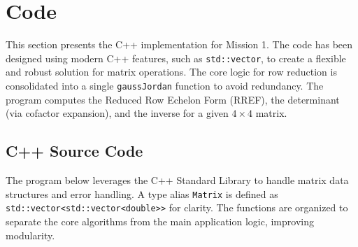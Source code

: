 \documentclass{article}
\begin{document}
\section{Code}

This section presents the C++ implementation for Mission 1. The code has been designed using modern C++ features, such as \texttt{std::vector}, to create a flexible and robust solution for matrix operations. The core logic for row reduction is consolidated into a single \texttt{gaussJordan} function to avoid redundancy. The program computes the Reduced Row Echelon Form (RREF), the determinant (via cofactor expansion), and the inverse for a given $4 \times 4$ matrix.

\subsection{C++ Source Code}

The program below leverages the C++ Standard Library to handle matrix data structures and error handling. A type alias \texttt{Matrix} is defined as \texttt{std::vector<std::vector<double>>} for clarity. The functions are organized to separate the core algorithms from the main application logic, improving modularity.
\end{document}
